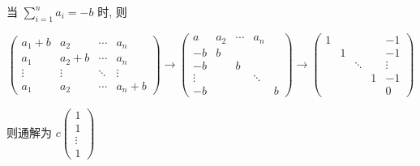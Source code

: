 \begin{enumerate}
                   当 $\sum_{i=1}^{n} a_{i} = -b$ 时, 则

                   $$ \begin{pmatrix}
                           a_{1}+b & a_{2}   & \cdots & a_{n}   \\
                           a_{1}   & a_{2}+b & \cdots & a_{n}   \\
                           \vdots  & \vdots  & \ddots & \vdots  \\
                           a_{1}   & a_{2}   & \cdots & a_{n}+b
                       \end{pmatrix}\to
                       \begin{pmatrix}
                           a      & a_2 & \cdots & a_n        \\
                           -b     & b   &        &            \\
                           -b     &     & b      &            \\
                           \vdots &     &        & \ddots     \\
                           -b     &     &        &        & b
                       \end{pmatrix}
                       \rightarrow \begin{pmatrix}
                           1 &   &        &   & -1     \\
                             & 1 &        &   & -1     \\
                             &   & \ddots &   & \vdots \\
                             &   &        & 1 & -1     \\
                             &   &        &   & 0
                       \end{pmatrix} $$

                   则通解为 $c\begin{pmatrix}
                           1      \\
                           1      \\
                           \vdots \\
                           1
                       \end{pmatrix} $
         \end{enumerate}


 \subsection{} %


